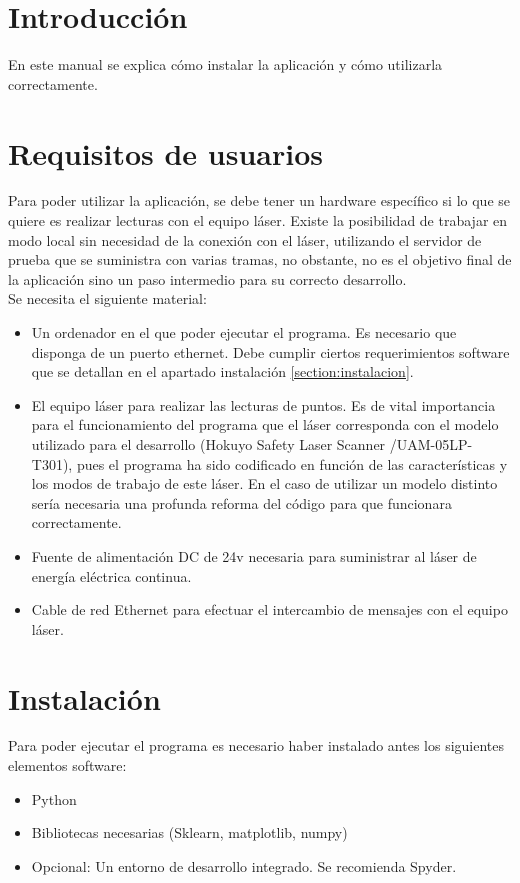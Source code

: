 
\section{Introducción}
En este manual se explica cómo instalar la aplicación y cómo utilizarla correctamente.

\section{Requisitos de usuarios}

Para poder utilizar la aplicación, se debe tener un hardware específico si lo que se quiere es realizar lecturas con el equipo láser. Existe la posibilidad de trabajar en modo local sin necesidad de la conexión con el láser, utilizando el servidor de prueba que se suministra con varias tramas, no obstante, no es el objetivo final de la aplicación sino un paso intermedio para su correcto desarrollo.\\
Se necesita el siguiente material:\\
\begin{itemize}
\item Un ordenador en el que poder ejecutar el programa. Es necesario que disponga de un puerto ethernet. Debe cumplir ciertos requerimientos software que se detallan en el apartado instalación \ref{section:instalacion}.
\item El equipo láser para realizar las lecturas de puntos. Es de vital importancia para el funcionamiento del programa que el láser corresponda con el modelo utilizado para el desarrollo (Hokuyo Safety Laser Scanner /UAM-05LP-T301), pues el programa ha sido codificado en función de las características y los modos de trabajo de este láser. En el caso de utilizar un modelo distinto sería necesaria una profunda reforma del código para que funcionara correctamente.
\item Fuente de alimentación DC de 24v necesaria para suministrar al láser de energía eléctrica continua.
\item Cable de red Ethernet para efectuar el intercambio de mensajes con el equipo láser.
\end{itemize}
\section{Instalación}\label{instalacion}
Para poder ejecutar el programa es necesario haber instalado antes los siguientes elementos software:\\
\begin{itemize}
\tightlist
\item Python
\item Bibliotecas necesarias (Sklearn, matplotlib, numpy)
\item Opcional: Un entorno de desarrollo integrado. Se recomienda Spyder.
\end{itemize}

